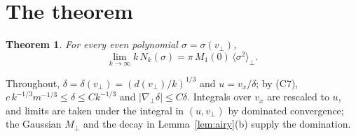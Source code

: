 \documentclass[11pt]{article}
\newcommand{\avg}[1]{\langle #1\rangle}
\newtheorem{theorem}{Theorem}
\theoremstyle{remark}
\begin{document}
\section{The theorem}

\begin{theorem}\label{thm:main}
For every even polynomial $\sigma=\sigma(v_\perp)$,
\[
  \lim_{k\to\infty}k\,N_k(\sigma)=\pi\,M_1(0)\,\avg{\sigma^2}_\perp .
\]
\end{theorem}

Throughout, $\delta=\delta(v_\perp)=(d(v_\perp)/k)^{1/3}$ and
$u=v_x/\delta$; by (C7), $c\,k^{-1/3}m^{-1/3}\le\delta\le Ck^{-1/3}$ and
$|\nabla_\perp\delta|\le C\delta$. Integrals over $v_x$ are rescaled to $u$,
and limits are taken under the integral in $(u,v_\perp)$ by dominated
convergence; the Gaussian $M_\perp$ and the decay in Lemma~\ref{lem:airy}(b)
supply the domination.
\end{document}
